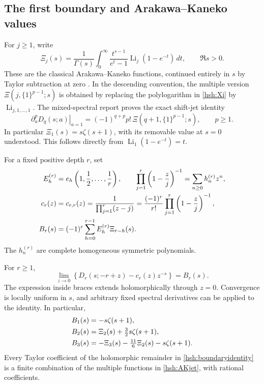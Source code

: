 \subsection{The first boundary and Arakawa--Kaneko values}

For $j\geq1$, write
\begin{equation}\label{hsh:Xi}
 \Xi_j(s)=\frac1{\Gamma(s)}\int_0^\infty
   \frac{t^{s-1}}{e^t-1}\operatorname{Li}_j(1-e^{-t})\,dt,
 \qquad \Re s>0.
\end{equation}
These are the classical Arakawa--Kaneko functions, continued entirely
in $s$ by Taylor subtraction at zero
\cite{ArakawaKaneko,KanekoTsumura}.  In the descending convention,
the multiple version $\Xi(j,\{1\}^{p-1};s)$ is obtained by replacing
the polylogarithm in \eqref{hsh:Xi} by
$\operatorname{Li}_{j,1,\ldots,1}$.
The mixed-spectral report proves the exact shift-jet identity
\begin{equation}\label{hsh:AKjet}
 \left.\partial_a^pD_q(s;a)\right|_{a=1}
      =(-1)^{q+p}p!\,\Xi(q+1,\{1\}^{p-1};s),\qquad p\geq1.
\end{equation}
In particular $\Xi_1(s)=s\zeta(s+1)$, with its removable value
at $s=0$ understood.  This follows directly from
$\operatorname{Li}_1(1-e^{-t})=t$.

For a fixed positive depth $r$, set
\begin{align}
 E_h^{(r)}&=e_h\left(1,\frac12,\ldots,\frac1r\right),
 \qquad\prod_{j=1}^r\left(1-\frac zj\right)^{-1}
       =\sum_{n\geq0}h_n^{(r)}z^n,\label{hsh:eh}\\
 c_r(z)&=c_{r,r}(z)=\frac1{\prod_{j=1}^r(z-j)}
       =\frac{(-1)^r}{r!}\prod_{j=1}^r\left(1-\frac zj\right)^{-1},\notag\\
 B_r(s)&=(-1)^r\sum_{h=0}^{r-1}E_h^{(r)}\Xi_{r-h}(s).
                                                       \label{hsh:B}
\end{align}
The $h_n^{(r)}$ are complete homogeneous symmetric polynomials.

\begin{theorem}\label{hsh:boundary}
For $r\geq1$,
\begin{equation}\label{hsh:boundaryidentity}
 \boxed{\displaystyle
 \lim_{z\to0}\left\{D_r(s;-r+z)-c_r(z)z^{-s}\right\}=B_r(s).}
\end{equation}
The expression inside braces extends holomorphically through $z=0$.
Convergence is locally uniform in $s$, and arbitrary fixed spectral
derivatives can be applied to the identity.  In particular,
\begin{align}
 B_1(s)&=-s\zeta(s+1),\notag\\
 B_2(s)&=\Xi_2(s)+\tfrac32s\zeta(s+1),\notag\\
 B_3(s)&=-\Xi_3(s)-\tfrac{11}{6}\Xi_2(s)-s\zeta(s+1).
                                                       \label{hsh:examples}
\end{align}
Every Taylor coefficient of the holomorphic remainder in
\eqref{hsh:boundaryidentity} is a finite combination of the multiple
functions in \eqref{hsh:AKjet}, with rational coefficients.
\end{theorem}

